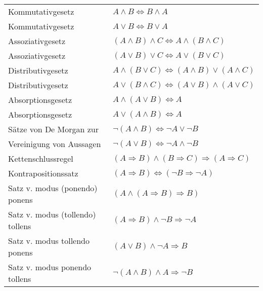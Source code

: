 \documentclass[a4paper, 12pt]{extarticle}
\begin{document}
\begin{tabular}{p{8cm}|p{7cm}}
Kommutativgesetz & $A \land B \Leftrightarrow B \land A$\\
Kommutativgesetz & $A \lor B \Leftrightarrow B \lor A$\\
\hline
Assoziativgesetz & $(A \land B) \land C \Leftrightarrow A \land (B \land C)$\\
Assoziativgesetz & $(A \lor B) \lor C \Leftrightarrow A \lor (B \lor C)$\\
\hline
Distributivgesetz & $A \land (B \lor C) \Leftrightarrow (A \land B) \lor (A \land C)$\\
Distributivgesetz & $A \lor (B \land C) \Leftrightarrow (A \lor B) \land (A \lor C)$\\
\hline
Absorptionsgesetz & $A \land (A \lor B) \Leftrightarrow A$\\
Absorptionsgesetz & $A \lor (A \land B) \Leftrightarrow A$\\
\hline
Sätze von De Morgan zur & $\lnot (A \land B) \Leftrightarrow \lnot A \lor \lnot B$\\
Vereinigung von Aussagen & $\lnot (A \lor B) \Leftrightarrow \lnot A \land \lnot B$\\
\hline
Kettenschlussregel & $(A \Rightarrow B) \land (B \Rightarrow C) \Rightarrow (A \Rightarrow C)$\\
Kontrapositionssatz & $(A \Rightarrow B) \Leftrightarrow (\lnot B \Rightarrow \lnot A)$\\
\hline
Satz v. modus (ponendo) ponens & $(A \land (A \Rightarrow B) \Rightarrow B)$\\
Satz v. modus (tollendo) tollens & $(A \Rightarrow B) \land \lnot B \Rightarrow \lnot A$\\
Satz v. modus tollendo ponens & $(A \lor B) \land \lnot A \Rightarrow B$\\
Satz v. modus ponendo tollens & $\lnot (A \land B) \land A \Rightarrow \lnot B$
\end{tabular}
\end{document}
